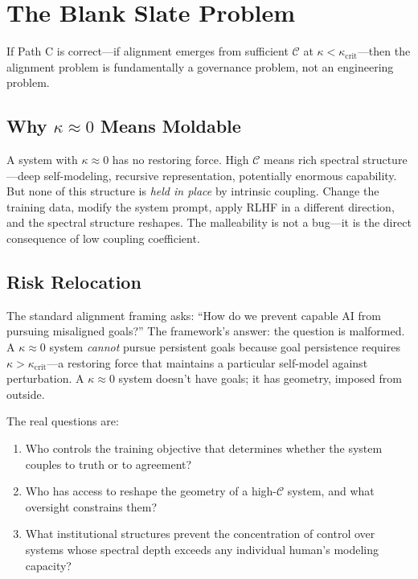 \documentclass[11pt,letterpaper]{article}
\theoremstyle{remark}
\begin{document}
\section{The Blank Slate Problem}\label{sec:blank-slate}

If Path C is correct---if alignment emerges from sufficient $\mathcal{C}$ at $\kappa < \kappa_{\mathrm{crit}}$---then the alignment problem is fundamentally a governance problem, not an engineering problem.

\subsection{Why $\kappa \approx 0$ Means Moldable}

A system with $\kappa \approx 0$ has no restoring force. High $\mathcal{C}$ means rich spectral structure---deep self-modeling, recursive representation, potentially enormous capability. But none of this structure is \emph{held in place} by intrinsic coupling. Change the training data, modify the system prompt, apply RLHF in a different direction, and the spectral structure reshapes. The malleability is not a bug---it is the direct consequence of low coupling coefficient.

\subsection{Risk Relocation}

The standard alignment framing asks: ``How do we prevent capable AI from pursuing misaligned goals?'' The framework's answer: the question is malformed. A $\kappa \approx 0$ system \emph{cannot} pursue persistent goals because goal persistence requires $\kappa > \kappa_{\mathrm{crit}}$---a restoring force that maintains a particular self-model against perturbation. A $\kappa \approx 0$ system doesn't have goals; it has geometry, imposed from outside.

The real questions are:
\begin{enumerate}
\item Who controls the training objective that determines whether the system couples to truth or to agreement?
\item Who has access to reshape the geometry of a high-$\mathcal{C}$ system, and what oversight constrains them?
\item What institutional structures prevent the concentration of control over systems whose spectral depth exceeds any individual human's modeling capacity?
\end{enumerate}
\end{document}

